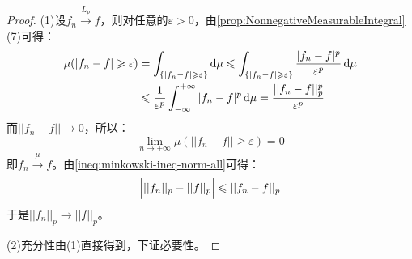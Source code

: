 \begin{proof}
	(1)设$f_n\overset{L_p}{\longrightarrow}f$，则对任意的$\varepsilon>0$，由\cref{prop:NonnegativeMeasurableIntegral}(7)可得：
	\begin{align*}
		\mu(|f_n-f|\geqslant\varepsilon)
		&=\int_{\{|f_n-f|\geqslant\varepsilon\}}\mathop{}\!\mathrm{d}\mu\leqslant\int_{\{|f_n-f|\geqslant\varepsilon\}}\frac{|f_n-f|^p}{\varepsilon^p}\mathop{}\!\mathrm{d}\mu \\
		&\leqslant\frac{1}{\varepsilon^p}\int_{-\infty}^{+\infty}|f_n-f|^p\mathop{}\!\mathrm{d}\mu=\frac{||f_n-f||^p_p}{\varepsilon^p}
	\end{align*}
	而$||f_n-f||\to0$，所以：
	\begin{equation*}
		\lim_{n\to+\infty}\mu(||f_n-f||\geqslant\varepsilon)=0
	\end{equation*}
	即$f_n\overset{\mu}{\longrightarrow}f$。由\cref{ineq:minkowski-ineq-norm-all}可得：
	\begin{equation*}
		\Bigl|||f_n||_p-||f||_p\Bigr|\leqslant||f_n-f||_p
	\end{equation*}
	于是$||f_n||_p\to||f||_p$。\par
	(2)充分性由(1)直接得到，下证必要性。
\end{proof}
